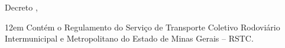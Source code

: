 
\begin{titlepage}

\vspace*{\fill} %

\begin{flushright}
{\LARGE Decreto \NumeroAto, \DataAssinatura} \\ [1.5cm]
\end{flushright}

\leftskip12em
Contém o Regulamento do Serviço de Transporte Coletivo Rodoviário Intermunicipal e Metropolitano do Estado de Minas Gerais – RSTC.

\vspace{1.5\baselineskip}

\end{titlepage}
